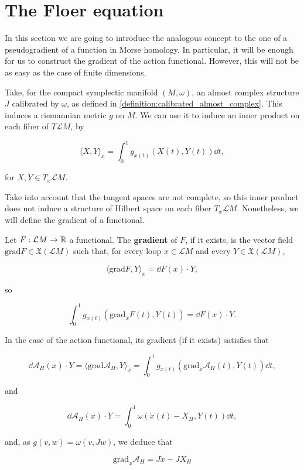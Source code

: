 \section{The Floer equation}

In this section we are going to introduce the analogous concept to the one of a pseudogradient of a function in Morse homology. In particular, it will be enough for us to construct the gradient of the action functional. However, this will not be as easy as the case of finite dimensions.

Take, for the compact symplectic manifold $(M,\omega)$, an almost complex structure $J$ calibrated by $\omega$, as defined in \ref{definition:calibrated_almost_complex}. This induces a riemannian metric $g$ on $M$. We can use it to induce an inner product on each fiber of $T\mathcal{L}M$, by

$$\langle X, Y \rangle_x = \int_0^1 g_{x(t)} (X(t), Y(t)) \dd t,$$

for $X,Y \in T_x\mathcal{L}M$.

Take into account that the tangent spaces are not complete, so this inner product does not induce a structure of Hilbert space on each fiber $T_x\mathcal{L}M$. Nonetheless, we will define the gradient of a functional.

\begin{deff}
Let $F : \mathcal{L}M \rightarrow \mathbb{R}$ a functional. The {\bf gradient} of $F$, if it exists, is the vector field $\text{grad}F \in \mathfrak{X}(\mathcal{L}M)$ such that, for every loop $x \in \mathcal{L}M$ and every $Y \in \mathfrak{X}(\mathcal{L}M)$,

$$\langle \text{grad}F, Y \rangle_x = \dd F(x) \cdot Y ,$$

so

$$\int_0^1 g_{x(t)}(\text{grad}_xF(t),Y(t)) = \dd F(x) \cdot Y .$$
\end{deff}

In the case of the action functional, its gradient (if it exists) satisfies that

$$\dd \mathcal{A}_H(x) \cdot Y = \langle \text{grad}\mathcal{A}_H, Y \rangle_x = \int_0^1 g_{x(t)}(\text{grad}_x\mathcal{A}_H(t),Y(t)) \dd t ,$$

and

$$\dd \mathcal{A}_H(x) \cdot Y = \int_0^1 \omega(\dot{x}(t)-X_H,Y(t)) \dd t ,$$

and, as $g(v,w) = \omega(v,Jw)$, we deduce that

$$\text{grad}_x\mathcal{A}_H = J\dot{x} - J X_H$$
